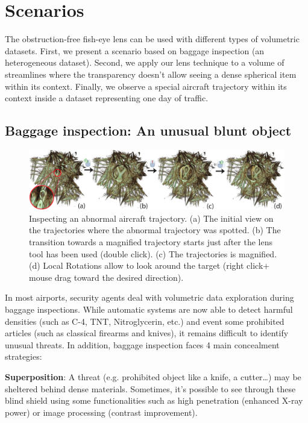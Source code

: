 \section{Scenarios}


The obstruction-free fish-eye lens can be used with different types of volumetric datasets. First, we present a scenario based on baggage inspection (an heterogeneous dataset). Second, we apply our lens technique to a volume of streamlines where the transparency doesn't allow seeing a dense spherical item within its context. Finally, we observe  a special aircraft trajectory within its context inside a dataset representing one day of traffic.

\subsection{Baggage inspection: An unusual blunt object}

\begin{figure} 
\includegraphics [width=\textwidth]{images/aircraft_lens.pdf} 
\caption{Inspecting an abnormal aircraft trajectory. (a) The initial view on the trajectories where the abnormal trajectory was spotted. (b) The transition  towards a magnified trajectory starts just after the lens tool has been used (double click). (c) The trajectories is magnified. (d) Local Rotations allow to look around the target (right click+ mouse drag toward the desired direction).}
\label{f:aircraft_lens}
\end{figure}
In most airports, security agents deal with volumetric data exploration during baggage inspections. While automatic systems are now able to detect harmful densities (such as  C-4, TNT, Nitroglycerin, etc.) and event some prohibited articles (such as classical firearms and knives), it remains difficult to identify unusual threats. In addition, baggage inspection faces 4 main concealment strategies:

\textbf{Superposition}: A threat (e.g. prohibited object like a knife, a cutter…) may be sheltered behind dense materials. Sometimes, it’s possible to see through these blind shield using some functionalities such as high penetration (enhanced X-ray power) or image processing (contrast improvement). 

